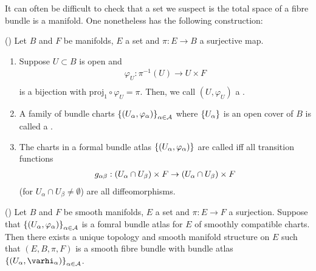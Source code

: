 \documentclass[main.tex]{subfiles}
\begin{document}
It can often be difficult to check that a set we suspect is the total space of a fibre bundle is a manifold. One nonetheless has the following construction:

\begin{defn}
() Let $B$ and $F$ be manifolds, $E$ a set and $\pi: E \to B$ a surjective map.
\begin{enumerate}
    \item Suppose $U \subset B$ is open and 
    \begin{align*}
        \varphi_U : \pi^{-1}(U) \to U \times F \\
    \end{align*}
    is a bijection with $\text{proj}_1 \circ \varphi_U = \pi$. Then, we call $(U, \varphi_U)$ a .
    \item A family of bundle charts $\left\{\left( U_\alpha, \varphi_\alpha \right)\right\}_{\alpha \in \mathcal{A}}$ where $\left\{U_\alpha\right\}$ is an open cover of $B$ is called a .
    
    \item The charts in a formal bundle atlas $\left\{ \left( U_\alpha, \varphi_\alpha  \right) \right\}$ are called  iff all transition functions
    \begin{align*}
        g_{\alpha\beta}: \left( U_\alpha \cap U_\beta \right) \times F \to \left( U_\alpha \cap U_\beta \right) \times F
    \end{align*} (for $U_\alpha \cap U_\beta \neq \emptyset$) are all diffeomorphisms.
\end{enumerate}
\end{defn}

\begin{thm}
() Let $B$ and $F$ be smooth manifolds, $E$ a set and $\pi: E \to F$ a surjection. Suppose that $\left\{ \left(  U_\alpha, \varphi_\alpha  \right)\right\}_{\alpha \in \mathcal{A}}$ is a fomral bundle atlas for $E$ of smoothly compatible charts. Then there exists a unique topology and smooth manifold structure on $E$ such that $(E, B, \pi, F)$ is a smooth fibre bundle with bundle atlas $ \brc{ \br{U_\alpha, \varhi_\alpha} }_{\alpha \in \mathcal{A}}$. 
\end{thm}
\end{document}
